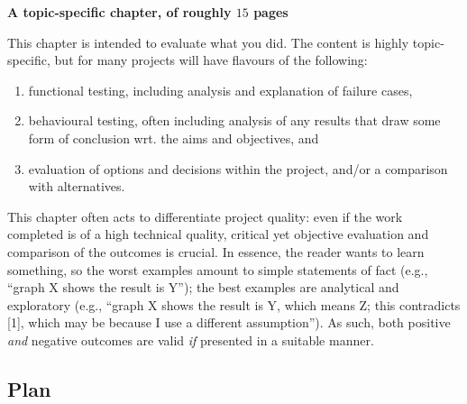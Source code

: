 \documentclass[ %
                    author={Callum Pearce},
                supervisor={Dr. Neill Campbell},
                    degree={MEng},
                     title={How effective are Temporal difference learning methods for reducing the number of zero contribution light paths while still accurately approximating Global Illumination in Path tracing?},
                  subtitle={},
                      type={research},
                      year={2019} ]{dissertation}
\begin{document}
{\bf A topic-specific chapter, of roughly $15$ pages} 
\vspace{1cm} 

\noindent
This chapter is intended to evaluate what you did.  The content is highly 
topic-specific, but for many projects will have flavours of the following:

\begin{enumerate}
\item functional  testing, including analysis and explanation of failure 
      cases,
\item behavioural testing, often including analysis of any results that 
      draw some form of conclusion wrt. the aims and objectives,
      and
\item evaluation of options and decisions within the project, and/or a
      comparison with alternatives.
\end{enumerate}

\noindent
This chapter often acts to differentiate project quality: even if the work
completed is of a high technical quality, critical yet objective evaluation 
and comparison of the outcomes is crucial.  In essence, the reader wants to
learn something, so the worst examples amount to simple statements of fact 
(e.g., ``graph X shows the result is Y''); the best examples are analytical 
and exploratory (e.g., ``graph X shows the result is Y, which means Z; this 
contradicts [1], which may be because I use a different assumption'').  As 
such, both positive {\em and} negative outcomes are valid {\em if} presented 
in a suitable manner.

\subsection{Plan}
\end{document}
